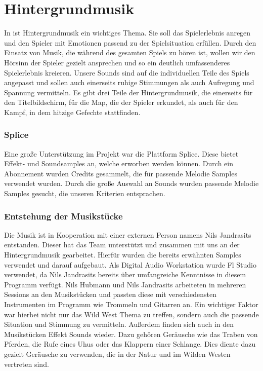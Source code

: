 
\section{Hintergrundmusik}\label{sec:hintergrundmusik}

\renewcommand{\kapitelautor}{Autor: Nils Hubmann}

%
In \ff ist Hintergrundmusik ein wichtiges Thema.
Sie soll das Spielerlebnis anregen und den Spieler mit Emotionen passend zu der Spielsituation erfüllen.
Durch den Einsatz von Musik, die während des gesamten Spiels zu hören ist, wollen wir den Hörsinn der Spieler gezielt ansprechen und so ein deutlich umfassenderes Spielerlebnis kreieren.
Unsere Sounds sind auf die individuellen Teile des Spiels angepasst und sollen auch einerseits ruhige Stimmungen als auch Aufregung und Spannung vermitteln.
Es gibt drei Teile der Hintergrundmusik, die einerseits für den Titelbildschirm, für die Map, die der Spieler erkundet, als auch für den Kampf, in dem hitzige Gefechte stattfinden.

\subsubsection{Splice}\label{subsubsec:Splice}
Eine große Unterstützung im Projekt war die Plattform Splice.
Diese bietet Effekt- und Soundsamples an, welche erworben werden können.
Durch ein Abonnement wurden Credits gesammelt, die für passende Melodie Samples verwendet wurden.
Durch die große Auswahl an Sounds wurden passende Melodie Samples gesucht, die unseren Kriterien entsprachen.

\subsubsection{Entstehung der Musikstücke}\label{subsubsec:Musik-Enstehung}
Die Musik ist in Kooperation mit einer externen Person namens Nils Jandrasits entstanden.
Dieser hat das Team unterstützt und zusammen mit uns an der Hintergrundmusik gearbeitet.
Hierfür wurden die bereits erwähnten Samples verwendet und darauf aufgebaut.
Als Digital Audio Workstation wurde Fl Studio verwendet, da Nils Jandrasits bereits über umfangreiche Kenntnisse in diesem Programm verfügt.
Nils Hubmann und Nils Jandrasits arbeiteten in mehreren Sessions an den Musikstücken und passten diese mit verschiedensten Instrumenten im Programm wie Trommeln und Gitarren an.
Ein wichtiger Faktor war hierbei nicht nur das Wild West Thema zu treffen, sondern auch die passende Situation und Stimmung zu vermitteln.
Außerdem finden sich auch in den Musikstücken Effekt Sounds wieder.
Dazu gehören Geräusche wie das Traben von Pferden, die Rufe eines Uhus oder das Klappern einer Schlange.
Dies diente dazu gezielt Geräusche zu verwenden, die in der Natur und im Wilden Westen vertreten sind.

